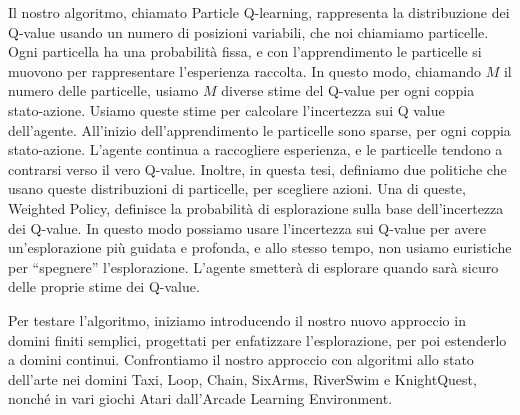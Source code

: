 Il nostro algoritmo, chiamato Particle Q-learning, rappresenta la distribuzione dei Q-value usando un numero di posizioni variabili, che noi chiamiamo particelle. Ogni particella ha una probabilità fissa, e con l'apprendimento le particelle si muovono per rappresentare l'esperienza raccolta. In questo modo, chiamando $M$ il numero delle particelle, usiamo $M$ diverse stime del Q-value per ogni coppia stato-azione. Usiamo queste stime per calcolare l'incertezza sui Q value dell'agente. All'inizio dell'apprendimento le particelle sono sparse, per ogni coppia stato-azione. L'agente continua a raccogliere esperienza, e le particelle tendono a contrarsi verso il vero Q-value. Inoltre, in questa tesi, definiamo due politiche che usano queste distribuzioni di particelle, per scegliere  azioni. Una di queste, Weighted Policy, definisce la probabilità di esplorazione sulla base dell'incertezza dei Q-value. In questo modo possiamo usare l'incertezza sui Q-value per avere un'esplorazione più guidata e profonda, e allo stesso tempo, non usiamo euristiche per ``spegnere'' l'esplorazione. L'agente smetterà di esplorare quando sarà sicuro delle proprie stime dei Q-value.\par
Per testare l'algoritmo, iniziamo introducendo il nostro nuovo approccio in domini finiti semplici, progettati per enfatizzare l'esplorazione, per poi estenderlo a domini continui. Confrontiamo il nostro approccio con algoritmi allo stato dell'arte nei domini Taxi, Loop, Chain, SixArms, RiverSwim e KnightQuest, nonché in vari giochi Atari dall'Arcade Learning Environment.